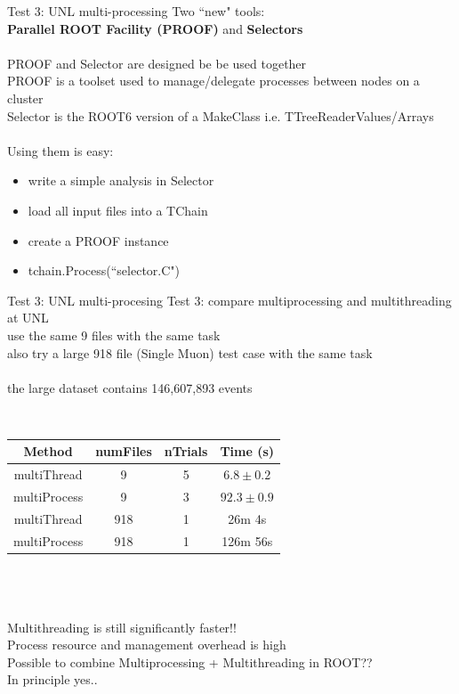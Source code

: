 \documentclass[10pt]{beamer}
\begin{document}
\begin{frame}{Test 3: UNL multi-processing}
Two ``new" tools:\\ 

\textbf{Parallel ROOT Facility (PROOF)} and \textbf{Selectors}\\
\quad \quad \\
PROOF and Selector are designed be be used together\\
PROOF is a toolset used to manage/delegate processes between nodes on a cluster\\
Selector is the ROOT6 version of a MakeClass i.e. TTreeReaderValues/Arrays\\
\quad \quad \\
Using them is easy:
\begin{itemize}
\item write a simple analysis in Selector
\item load all input files into a TChain
\item create a PROOF instance
\item tchain.Process(``selector.C")
\end{itemize}


\end{frame}
\begin{frame}{Test 3: UNL multi-procesing}
Test 3: compare multiprocessing and multithreading at UNL\\
\quad use the same 9 files with the same task\\
\quad also try a large 918 file (Single Muon) test case with the same task\\

\quad \quad \\
the large dataset contains 146,607,893 events

\quad \quad \\
\begin{tabular}{|c|c|c|c|}
\hline 
Method & numFiles & nTrials & Time (s) \\ 
\hline 
multiThread & 9 & 5 & $6.8 \pm 0.2$\\ 
\hline 
multiProcess & 9 & 3 & $92.3 \pm 0.9$ \\ 
\hline 
\hline
\hline 
multiThread & 918 & 1 & 26m 4s \\ 
\hline 
multiProcess & 918 & 1 & 126m 56s \\ 
\hline 
\end{tabular} \\
\quad \quad \\ 

\quad \quad \\
Multithreading is still significantly faster!!\\
Process resource and management overhead is high\\
Possible to combine Multiprocessing + Multithreading in ROOT??\\ In principle yes..
\end{frame}
\end{document}
